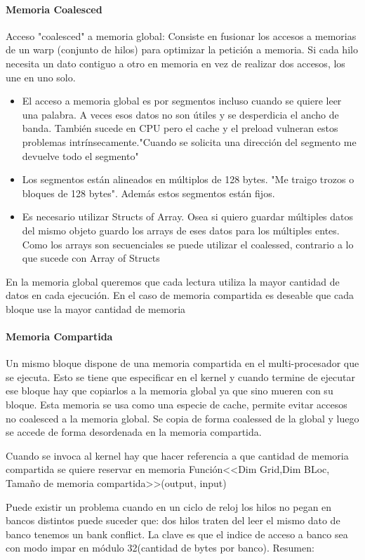 \documentclass[]{scrartcl}
\begin{document}
\paragraph{Memoria Coalesced}
Acceso "coalesced" a memoria global: Consiste en fusionar los accesos a memorias de un warp (conjunto de hilos) para optimizar la petición a memoria. Si cada hilo necesita un dato contiguo a otro en memoria en vez de realizar dos accesos, los une en uno solo. 
\begin{itemize}
	\item El acceso a memoria global es por segmentos incluso cuando se quiere leer una palabra. A veces esos datos no son útiles y se desperdicia el ancho de banda. También sucede en CPU pero el cache y el preload vulneran estos problemas intrínsecamente."Cuando se solicita una dirección del segmento me devuelve todo el segmento" 
	\item Los segmentos están alineados en múltiplos de 128 bytes. "Me traigo trozos o bloques de 128 bytes". Además estos segmentos están fijos.
	\item Es necesario utilizar Structs of Array. Osea si quiero guardar múltiples datos del mismo objeto guardo los arrays de eses datos para los múltiples entes. Como los arrays son secuenciales se puede utilizar el coalessed, contrario a lo que sucede con Array of Structs
\end{itemize}

En la memoria global queremos que cada lectura utiliza la mayor cantidad de datos en cada ejecución. En el caso de memoria compartida es deseable que cada bloque use la mayor cantidad de memoria
\paragraph{Memoria Compartida}
Un mismo bloque dispone de una memoria compartida en el multi-procesador que se ejecuta. Esto se tiene que especificar en el kernel y cuando termine de ejecutar ese bloque hay que copiarlos a la memoria global ya que sino mueren con su bloque. Esta memoria se usa como una especie de cache, permite evitar accesos no coalesced a la memoria global. Se copia de forma coalessed de la global y luego se accede de forma desordenada en la memoria compartida.  

Cuando se invoca al kernel hay que hacer referencia a que cantidad de memoria compartida se quiere reservar en memoria Función<<Dim Grid,Dim BLoc, Tamaño de memoria compartida>>(output, input)

Puede existir un problema cuando en un ciclo de reloj los hilos no pegan en bancos distintos puede suceder que: dos hilos traten del leer el mismo dato de banco tenemos un bank conflict. La clave es que el indice de acceso a banco sea con modo impar en módulo 32(cantidad de bytes por banco). Resumen:
\end{document}
